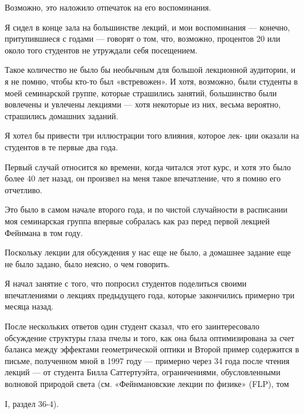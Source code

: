 \documentclass[10pt,oneside]{article}
\begin{document}
Возможно, это наложило отпечаток на его воспоминания.\par

Я сидел в конце зала на большинстве лекций, и мои воспоминания --- конечно, притупившиеся с годами --- говорят о том, что, возможно, процентов 20 или около того студентов не утруждали себя посещением.\par

Такое количество не было бы необычным для большой лекционной аудитории, и я не помню, чтобы кто-то был «встревожен». И хотя, возможно, были студенты в моей семинарской группе, которые страшились занятий, большинство были вовлечены и увлечены лекциями --- хотя некоторые из них, весьма вероятно, страшились домашних заданий.\par

Я хотел бы привести три иллюстрации того влияния, которое лек- ции оказали на студентов в те первые два года.\par

Первый случай относится ко времени, когда читался этот курс, и хотя это было более 40 лет назад, он произвел на меня такое впечатление, что я помню его отчетливо.\par

Это было в самом начале второго года, и по чистой случайности в расписании моя семинарская группа впервые собралась как раз перед первой лекцией Фейнмана в том году.\par

Поскольку лекции для обсуждения у нас еще не было, а домашнее задание еще не было задано, было неясно, о чем говорить.\par

Я начал занятие с того, что попросил студентов поделиться своими впечатлениями о лекциях предыдущего года, которые закончились примерно три месяца назад.\par

После нескольких ответов один студент сказал, что его заинтересовало обсуждение структуры глаза пчелы и того, как она была оптимизирована за счет баланса между эффектами геометрической оптики и Второй пример содержится в письме, полученном мной в 1997 году --- примерно через 34 года после чтения лекций --- от студента Билла Саттертуэйта, ограничениями, обусловленными волновой природой света (см. «Фейнмановские лекции по физике» (FLP), том\par

I, раздел 36-4).\par
\end{document}
